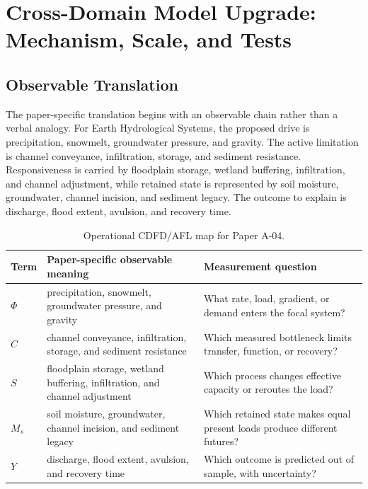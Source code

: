 \documentclass[11pt,a4paper]{article}
\begin{document}
\section{Cross-Domain Model Upgrade: Mechanism, Scale, and Tests}

\subsection{Observable Translation}

The paper-specific translation begins with an observable chain rather than a
verbal analogy. For Earth Hydrological Systems, the proposed drive is precipitation, snowmelt, groundwater pressure, and gravity.
The active limitation is channel conveyance, infiltration, storage, and sediment resistance. Responsiveness is carried by
floodplain storage, wetland buffering, infiltration, and channel adjustment, while retained state is represented by
soil moisture, groundwater, channel incision, and sediment legacy. The outcome to explain is discharge, flood extent, avulsion, and recovery time.

\begin{table}[htbp]
\centering
\small
\caption{Operational CDFD/AFL map for Paper A-04.}
\begin{tabularx}{\textwidth}{|l|X|X|}
\hline
\textbf{Term} & \textbf{Paper-specific observable meaning} & \textbf{Measurement question} \\
\hline
$\Phi$ & precipitation, snowmelt, groundwater pressure, and gravity & What rate, load, gradient, or demand enters the focal system? \\
\hline
$C$ & channel conveyance, infiltration, storage, and sediment resistance & Which measured bottleneck limits transfer, function, or recovery? \\
\hline
$S$ & floodplain storage, wetland buffering, infiltration, and channel adjustment & Which process changes effective capacity or reroutes the load? \\
\hline
$M_s$ & soil moisture, groundwater, channel incision, and sediment legacy & Which retained state makes equal present loads produce different futures? \\
\hline
$Y$ & discharge, flood extent, avulsion, and recovery time & Which outcome is predicted out of sample, with uncertainty? \\
\hline
\end{tabularx}
\end{table}
\end{document}
